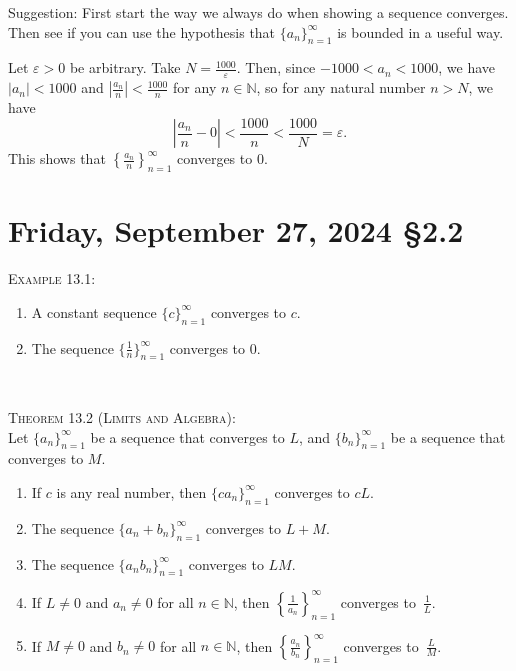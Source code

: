 \documentclass[12pt]{amsart}
\def\Fr{Friday}
\def\e{\varepsilon}
\newcommand{\N}{\mathbb{N}}
\numberwithin{equation}{section}
\theoremstyle{plain} %
\newcommand{\Sept}[3]{\section{#2, September #1, 2024 \quad \S#3}}
\theoremstyle{definition}
\theoremstyle{remark}
\begin{document}
\begin{enumerate}
Suggestion: First start the way we always do when showing a sequence converges. Then see if you can use the hypothesis that $\{a_n\}_{n=1}^\infty$ is bounded in a useful way.


\begin{framed}
Let $\e>0$ be arbitrary. Take $N=\frac{1000}{\e}$. Then, since $-1000<a_n<1000$, we have $|a_n|<1000$ and $\left|\frac{a_n}{n}\right|<\frac{1000}{n}$ for any $n\in \N$, so for any natural number $n>N$, we have
\[ \left| \frac{a_n}{n} - 0 \right| < \frac{1000}{n} < \frac{1000}{N} = \e.\]
This shows that $\displaystyle \left\{\frac{a_n}{n}\right\}_{n=1}^\infty$ converges to $0$.
\end{framed}
\end{enumerate}

\newpage 
\Sept{27}{\Fr}{2.2}



\begin{framed}
\noindent  \textsc{Example 13.1:} 
\begin{enumerate}
\item A constant sequence $\{c\}_{n=1}^\infty$ converges to $c$.
\item The sequence $\{\frac{1}{n}\}_{n=1}^\infty$ converges to $0$.
\end{enumerate}


\


\noindent \textsc{Theorem 13.2 (Limits and Algebra):}\\ Let $\{a_n\}_{n=1}^\infty$ be a sequence that converges to $L$, and $\{b_n\}_{n=1}^\infty$ be a sequence that converges to $M$.
\begin{enumerate}
\item If $c$ is any real number, then $\{ c a_n\}_{n=1}^\infty$ converges to $cL$.
\item The sequence $\{a_n + b_n\}_{n=1}^\infty$ converges to $L+M$.
\item The sequence $\{a_n b_n\}_{n=1}^\infty$ converges to $LM$.
\item If $L\neq 0$ and $a_n\neq 0$ for all $n\in \N$, then $\displaystyle\left\{\frac{1}{a_n}\right\}_{n=1}^\infty$\!\!\! converges to~$\displaystyle \frac{1}{L}$.
\item If $M\neq 0$ and $b_n\neq 0$ for all $n\in \N$, then $\displaystyle\left\{\frac{a_n}{b_n}\right\}_{n=1}^\infty$\!\!\! converges to~$\displaystyle \frac{L}{M}$.
\end{enumerate}
\end{framed}

\
\end{document}
